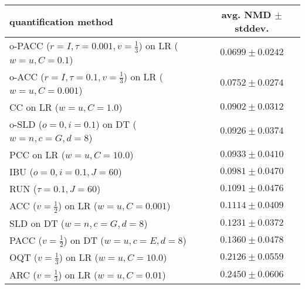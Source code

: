 \begin{tabular}{lc}
  \toprule
  quantification method & avg. NMD $\pm$ stddev. \\
  \midrule
  o-PACC ($r=I, \tau=0.001, v=\frac{1}{3}$) on LR ($w=u, C=0.1$) & $\mathbf{0.0699 \pm 0.0242}$ \\
  o-ACC ($r=I, \tau=0.1, v=\frac{1}{3}$) on LR ($w=u, C=0.001$) & $0.0752 \pm 0.0274$ \\
  CC on LR ($w=u, C=1.0$) & $0.0902 \pm 0.0312$ \\
  o-SLD ($o=0, i=0.1$) on DT ($w=n, c=G, d=8$) & $0.0926 \pm 0.0374$ \\
  PCC on LR ($w=u, C=10.0$) & $0.0933 \pm 0.0410$ \\
  IBU ($o=0, i=0.1, J=60$) & $0.0981 \pm 0.0470$ \\
  RUN ($\tau=0.1, J=60$) & $0.1091 \pm 0.0476$ \\
  ACC ($v=\frac{1}{2}$) on LR ($w=u, C=0.001$) & $0.1114 \pm 0.0409$ \\
  SLD on DT ($w=n, c=G, d=8$) & $0.1231 \pm 0.0372$ \\
  PACC ($v=\frac{1}{2}$) on DT ($w=u, c=E, d=8$) & $0.1360 \pm 0.0478$ \\
  OQT ($v=\frac{1}{3}$) on LR ($w=u, C=10.0$) & $0.2126 \pm 0.0559$ \\
  ARC ($v=\frac{1}{3}$) on LR ($w=u, C=0.01$) & $0.2450 \pm 0.0606$ \\
  \bottomrule
\end{tabular}
